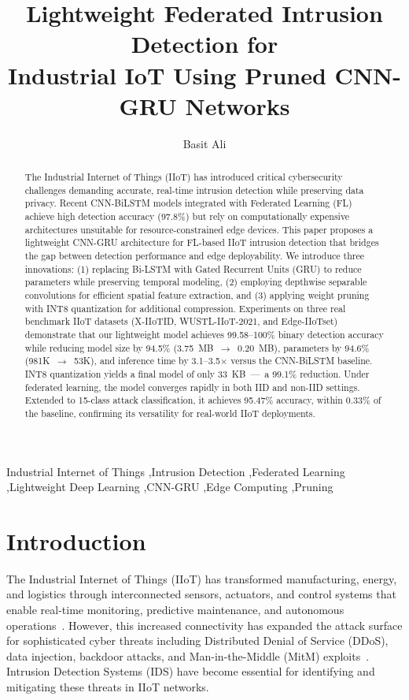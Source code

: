 \documentclass[a4paper,fleqn]{cas-sc}
\title[Lightweight FL-IIoT IDS]{Lightweight Federated Intrusion Detection for\\ Industrial IoT Using Pruned CNN-GRU Networks}
\author[1]{Basit Ali}[%
    auid=0000-0000-0000-0000,
    orcid=0000-0000-0000-0000]
\begin{document}
\maketitle

\begin{abstract}
The Industrial Internet of Things (IIoT) has introduced critical cybersecurity challenges demanding accurate, real-time intrusion detection while preserving data privacy. Recent CNN-BiLSTM models integrated with Federated Learning (FL) achieve high detection accuracy (97.8\%) but rely on computationally expensive architectures unsuitable for resource-constrained edge devices. This paper proposes a lightweight CNN-GRU architecture for FL-based IIoT intrusion detection that bridges the gap between detection performance and edge deployability. We introduce three innovations: (1) replacing Bi-LSTM with Gated Recurrent Units (GRU) to reduce parameters while preserving temporal modeling, (2) employing depthwise separable convolutions for efficient spatial feature extraction, and (3) applying weight pruning with INT8 quantization for additional compression. Experiments on three real benchmark IIoT datasets (X-IIoTID, WUSTL-IIoT-2021, and Edge-IIoTset) demonstrate that our lightweight model achieves 99.58--100\% binary detection accuracy while reducing model size by 94.5\% (3.75~MB~$\rightarrow$~0.20~MB), parameters by 94.6\% (981K~$\rightarrow$~53K), and inference time by 3.1--3.5$\times$ versus the CNN-BiLSTM baseline. INT8 quantization yields a final model of only 33~KB~---~a 99.1\% reduction. Under federated learning, the model converges rapidly in both IID and non-IID settings. Extended to 15-class attack classification, it achieves 95.47\% accuracy, within 0.33\% of the baseline, confirming its versatility for real-world IIoT deployments.
\end{abstract}

\begin{keywords}
Industrial Internet of Things \sep Intrusion Detection \sep Federated Learning \sep Lightweight Deep Learning \sep CNN-GRU \sep Edge Computing \sep Pruning
\end{keywords}

\section{Introduction}

The Industrial Internet of Things (IIoT) has transformed manufacturing, energy, and logistics through interconnected sensors, actuators, and control systems that enable real-time monitoring, predictive maintenance, and autonomous operations~\cite{xu2014survey,boyes2018framework}. However, this increased connectivity has expanded the attack surface for sophisticated cyber threats including Distributed Denial of Service (DDoS), data injection, backdoor attacks, and Man-in-the-Middle (MitM) exploits~\cite{hassanzadeh2020review,zolanvari2019machine}. Intrusion Detection Systems (IDS) have become essential for identifying and mitigating these threats in IIoT networks.
\end{document}
